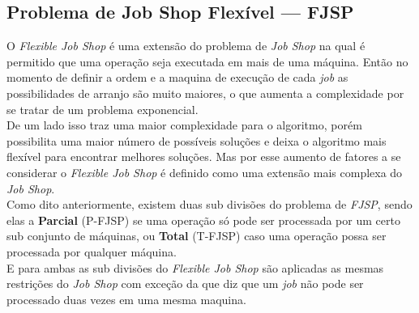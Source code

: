 \subsection{Problema de Job Shop Flexível — FJSP}
O \textit{Flexible Job Shop} é uma extensão do problema de \textit{Job Shop} na qual é permitido que uma operação seja executada em mais de uma máquina. Então no momento de definir a ordem e a maquina de execução de cada \textit{job} as possibilidades de arranjo são muito maiores, o que aumenta a complexidade por se tratar de um problema exponencial.\\
\indent De um lado isso traz uma maior complexidade para o algoritmo, porém possibilita uma maior número de possíveis soluções e deixa o algoritmo mais flexível para encontrar melhores soluções. Mas por esse aumento de fatores a se considerar o \textit{Flexible Job Shop} é definido como uma extensão mais complexa do \textit{Job Shop}.\\
\indent Como dito anteriormente, existem duas sub divisões do problema de \textit{FJSP}, sendo elas a \textbf{Parcial} (P-FJSP) se uma operação só pode ser processada por um certo sub conjunto de máquinas, ou \textbf{Total} (T-FJSP) caso uma operação possa ser processada por qualquer máquina.\\
\indent E para ambas as sub divisões do \textit{Flexible Job Shop} são aplicadas as mesmas restrições do \textit{Job Shop} com exceção da que diz que um \textit{job} não pode ser processado duas vezes em uma mesma maquina.\hfill

